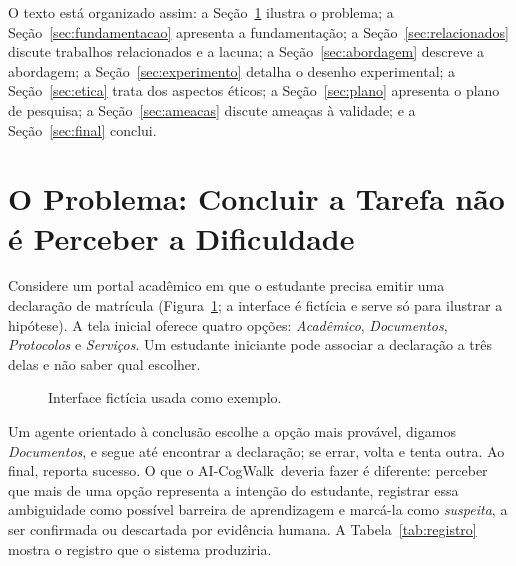 \documentclass[12pt]{article}
\newcommand{\proj}{AI-CogWalk}
\begin{document}
O texto está organizado assim: a Seção~\ref{sec:problema} ilustra o problema; a Seção~\ref{sec:fundamentacao} apresenta a fundamentação; a Seção~\ref{sec:relacionados} discute trabalhos relacionados e a lacuna; a Seção~\ref{sec:abordagem} descreve a abordagem; a Seção~\ref{sec:experimento} detalha o desenho experimental; a Seção~\ref{sec:etica} trata dos aspectos éticos; a Seção~\ref{sec:plano} apresenta o plano de pesquisa; a Seção~\ref{sec:ameacas} discute ameaças à validade; e a Seção~\ref{sec:final} conclui.

\section{O Problema: Concluir a Tarefa não é Perceber a Dificuldade}
\label{sec:problema}

Considere um portal acadêmico em que o estudante precisa emitir uma declaração de matrícula (Figura~\ref{fig:portal}; a interface é fictícia e serve só para ilustrar a hipótese). A tela inicial oferece quatro opções: \textit{Acadêmico}, \textit{Documentos}, \textit{Protocolos} e \textit{Serviços}. Um estudante iniciante pode associar a declaração a três delas e não saber qual escolher.

\begin{figure}[!ht]
\centering
{}
\caption{Interface fictícia usada como exemplo.}
\label{fig:portal}
\end{figure}

Um agente orientado à conclusão escolhe a opção mais provável, digamos \textit{Documentos}, e segue até encontrar a declaração; se errar, volta e tenta outra. Ao final, reporta sucesso. O que o \proj\ deveria fazer é diferente: perceber que mais de uma opção representa a intenção do estudante, registrar essa ambiguidade como possível barreira de aprendizagem e marcá-la como \textit{suspeita}, a ser confirmada ou descartada por evidência humana. A Tabela~\ref{tab:registro} mostra o registro que o sistema produziria.
\end{document}
